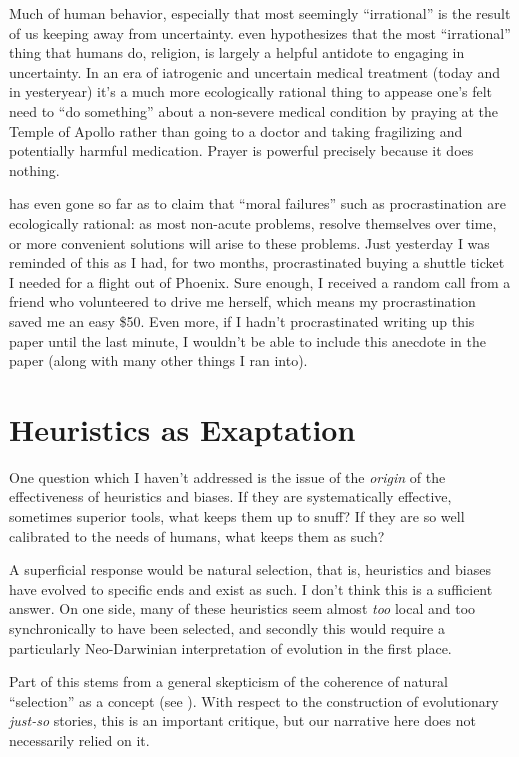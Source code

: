 \documentclass{article}
\begin{document}
Much of human behavior, especially that most seemingly ``irrational'' is the result of us keeping away from uncertainty.
\textcite{taleb12} even hypothesizes that the most ``irrational'' thing that humans do, religion, is largely a helpful antidote to engaging in uncertainty.
In an era of iatrogenic and uncertain medical treatment (today and in yesteryear) it's a much more ecologically rational thing to appease one's felt need to ``do something'' about a non-severe medical condition by praying at the Temple of Apollo rather than going to a doctor and taking fragilizing and potentially harmful medication.
Prayer is powerful precisely because it does nothing.

\textcite{taleb15} has even gone so far as to claim that ``moral failures'' such as procrastination are ecologically rational: as most non-acute problems, resolve themselves over time, or more convenient solutions will arise to these problems.
Just yesterday I was reminded of this as I had, for two months, procrastinated buying a shuttle ticket I needed for a flight out of Phoenix.
Sure enough, I received a random call from a friend who volunteered to drive me herself, which means my procrastination saved me an easy \$50.
Even more, if I hadn't procrastinated writing up this paper until the last minute, I wouldn't be able to include this anecdote in the paper (along with many other things I ran into).

\section{Heuristics as Exaptation}

One question which I haven't addressed is the issue of the \emph{origin} of the effectiveness of heuristics and biases.
If they are systematically effective, sometimes superior tools, what keeps them up to snuff?
If they are so well calibrated to the needs of humans, what keeps them as such?

A superficial response would be natural selection, that is, heuristics and biases have evolved to specific ends and exist as such.
I don't think this is a sufficient answer.
On one side, many of these heuristics seem almost \emph{too} local and too synchronically to have been selected, and secondly this would require a particularly Neo-Darwinian interpretation of evolution in the first place.

Part of this stems from a general skepticism of the coherence of natural ``selection'' as a concept (see \textcite{fodor10}).
With respect to the construction of evolutionary \textit{just-so} stories, this is an important critique, but our narrative here does not necessarily relied on it.
\end{document}
